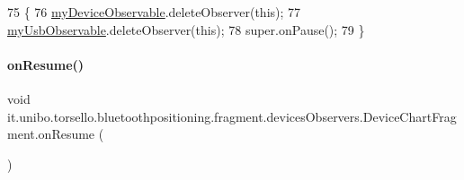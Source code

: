 \begin{DoxyCode}
75                           \{
76         \hyperlink{classit_1_1unibo_1_1torsello_1_1bluetoothpositioning_1_1fragment_1_1devicesObservers_1_1DeviceChartFragment_a2c8de6418fffdb5affe4de22185b55eb_a2c8de6418fffdb5affe4de22185b55eb}{myDeviceObservable}.deleteObserver(\textcolor{keyword}{this});
77         \hyperlink{classit_1_1unibo_1_1torsello_1_1bluetoothpositioning_1_1fragment_1_1devicesObservers_1_1DeviceChartFragment_a577dad67b3eabc0f48e95d08e9f5881b_a577dad67b3eabc0f48e95d08e9f5881b}{myUsbObservable}.deleteObserver(\textcolor{keyword}{this});
78         super.onPause();
79     \}
\end{DoxyCode}
\hypertarget{classit_1_1unibo_1_1torsello_1_1bluetoothpositioning_1_1fragment_1_1devicesObservers_1_1DeviceChartFragment_ae76428fde174d312bed28057f3f66d46_ae76428fde174d312bed28057f3f66d46}{}\label{classit_1_1unibo_1_1torsello_1_1bluetoothpositioning_1_1fragment_1_1devicesObservers_1_1DeviceChartFragment_ae76428fde174d312bed28057f3f66d46_ae76428fde174d312bed28057f3f66d46} 
\paragraph{\texorpdfstring{on\+Resume()}{onResume()}}
{\footnotesize\ttfamily void it.\+unibo.\+torsello.\+bluetoothpositioning.\+fragment.\+devices\+Observers.\+Device\+Chart\+Fragment.\+on\+Resume (\begin{DoxyParamCaption}{ }\end{DoxyParamCaption})}


